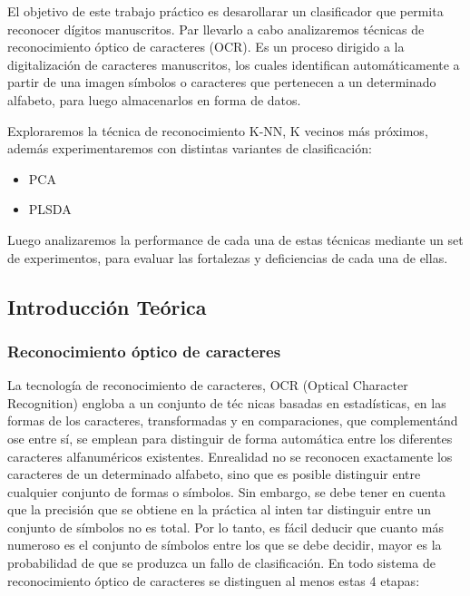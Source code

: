 El objetivo de este trabajo práctico es desarollarar un clasificador que permita reconocer dígitos manuscritos.
Par llevarlo a cabo analizaremos técnicas de reconocimiento óptico de caracteres (OCR). Es un proceso dirigido a la digitalización de caracteres manuscritos, los cuales identifican automáticamente a partir de una imagen símbolos o caracteres que pertenecen a un determinado alfabeto, para luego almacenarlos en forma de datos.

Exploraremos la técnica de reconocimiento K-NN, K vecinos más próximos, además experimentaremos con distintas variantes de clasificación:

\begin{itemize}
\item PCA
\item PLSDA
\end{itemize}


Luego analizaremos la performance de cada una de estas técnicas mediante un set de experimentos, para evaluar las fortalezas y deficiencias de cada una de ellas. \\


\subsection{Introducción Teórica}


\subsubsection{Reconocimiento óptico de caracteres}


La tecnología de reconocimiento de caracteres, OCR (Optical Character  Recognition)  engloba  a  un  conjunto  de  téc
nicas basadas en  estadísticas, en las formas de los caracteres, transformadas y en comparaciones, que complementánd
ose entre sí, se  emplean para  distinguir de forma automática entre  los diferentes caracteres alfanuméricos existentes.
Enrealidad no se reconocen  exactamente los  caracteres de un determinado alfabeto, sino que es posible distinguir entre cualquier conjunto de formas o símbolos. Sin embargo, se debe tener en cuenta que la precisión que se obtiene en la práctica al inten
tar distinguir entre un conjunto de símbolos no es total. Por lo tanto, es fácil  deducir  que  cuanto  más  numeroso  es  el conjunto de símbolos entre los que se debe decidir, mayor es la probabilidad de que se produzca un fallo de clasificación. 
En todo sistema de reconocimiento óptico de caracteres se distinguen al menos estas 4 etapas: 

